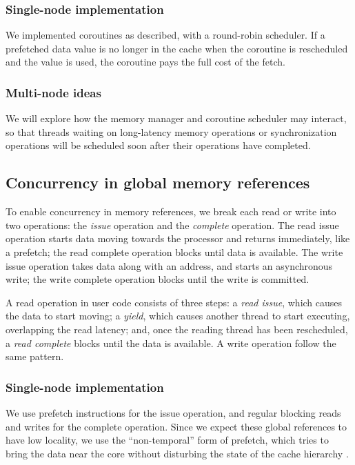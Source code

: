 \documentclass[10pt,nocopyrightspace,preprint]{sigplanconf}
\begin{document}
{\subsubsection{Single-node implementation}
We implemented coroutines as described, with a round-robin
scheduler. If a prefetched data value is no longer in the cache when
the coroutine is rescheduled and the value is used, the coroutine pays
the full cost of the fetch.

\subsubsection{Multi-node ideas}
We will explore how the memory manager and coroutine scheduler may
interact, so that threads waiting on long-latency memory operations or
synchronization operations will be scheduled soon after their
operations have completed. 

\subsection{Concurrency in global memory references}

To enable concurrency in memory references, we break each read or
write into two operations: the {\em issue} operation and the {\em
  complete} operation. The read issue operation starts data moving
towards the processor and returns immediately, like a prefetch; the
read complete operation blocks until data is available. The write
issue operation takes data along with an address, and starts an
asynchronous write; the write complete operation blocks until the
write is committed.

A read operation in user code consists of three steps: a {\em read
  issue}, which causes the data to start moving; a {\em yield}, which
causes another thread to start executing, overlapping the read
latency; and, once the reading thread has been rescheduled, a {\em
  read complete} blocks until the data is available. A write operation
follow the same pattern.

\subsubsection{Single-node implementation}
We use prefetch instructions for the issue operation, and regular
blocking reads and writes for the complete operation. Since we expect
these global references to have low locality, we use the
``non-temporal'' form of prefetch, which tries to bring the data near
the core without disturbing the state of the cache
hierarchy \cite{intel:swdev}.

}
\end{document}
